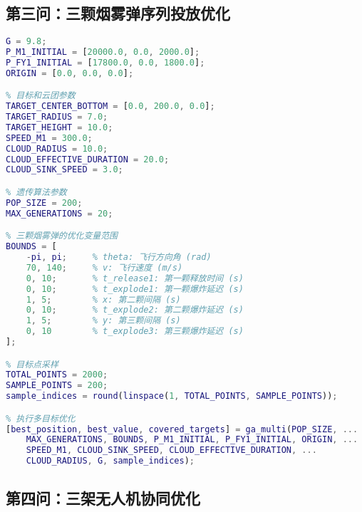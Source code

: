 \subsection{第三问：三颗烟雾弹序列投放优化}

\begin{lstlisting}[language=Matlab,caption={第三问核心优化代码}]
% 场景参数
G = 9.8;
P_M1_INITIAL = [20000.0, 0.0, 2000.0];
P_FY1_INITIAL = [17800.0, 0.0, 1800.0];
ORIGIN = [0.0, 0.0, 0.0];

% 目标和云团参数
TARGET_CENTER_BOTTOM = [0.0, 200.0, 0.0];
TARGET_RADIUS = 7.0;
TARGET_HEIGHT = 10.0;
SPEED_M1 = 300.0;
CLOUD_RADIUS = 10.0;
CLOUD_EFFECTIVE_DURATION = 20.0;
CLOUD_SINK_SPEED = 3.0;

% 遗传算法参数
POP_SIZE = 200;
MAX_GENERATIONS = 20;

% 三颗烟雾弹的优化变量范围
BOUNDS = [
    -pi, pi;     % theta: 飞行方向角 (rad)
    70, 140;     % v: 飞行速度 (m/s)
    0, 10;       % t_release1: 第一颗释放时间 (s)
    0, 10;       % t_explode1: 第一颗爆炸延迟 (s)
    1, 5;        % x: 第二颗间隔 (s)
    0, 10;       % t_explode2: 第二颗爆炸延迟 (s)
    1, 5;        % y: 第三颗间隔 (s)
    0, 10        % t_explode3: 第三颗爆炸延迟 (s)
];

% 目标点采样
TOTAL_POINTS = 2000;
SAMPLE_POINTS = 200;
sample_indices = round(linspace(1, TOTAL_POINTS, SAMPLE_POINTS));

% 执行多目标优化
[best_position, best_value, covered_targets] = ga_multi(POP_SIZE, ...
    MAX_GENERATIONS, BOUNDS, P_M1_INITIAL, P_FY1_INITIAL, ORIGIN, ...
    SPEED_M1, CLOUD_SINK_SPEED, CLOUD_EFFECTIVE_DURATION, ...
    CLOUD_RADIUS, G, sample_indices);
\end{lstlisting}

\subsection{第四问：三架无人机协同优化}

